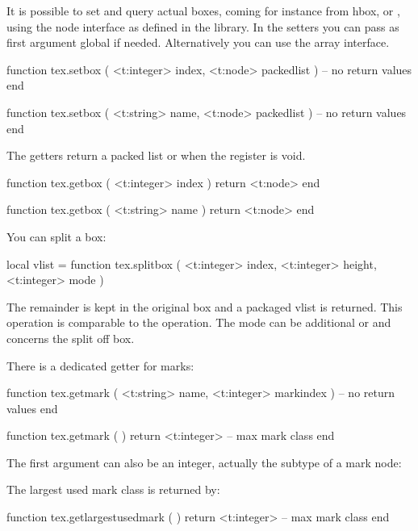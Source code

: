 \stopsubsection

\startsubsection[title={Box registers}]

It is possible to set and query actual boxes, coming for instance from \prm
{hbox},  or , using the node interface as defined in the
 library. In the setters you can pass as first argument \type
{global} if needed. Alternatively you can use the  array
interface.

\starttyping[option=LUA]
function tex.setbox (
    <t:integer> index,
    <t:node>    packedlist
)
    -- no return values
end

function tex.setbox (
    <t:string> name,
    <t:node>   packedlist
)
    -- no return values
end
\stoptyping

The getters return a packed list or  when the register is void.

\starttyping[option=LUA]
function tex.getbox (
    <t:integer> index
)
    return <t:node>
end

function tex.getbox (
    <t:string> name
)
    return <t:node>
end
\stoptyping

You can split a box:

\starttyping[option=LUA]
local vlist =
function tex.splitbox (
    <t:integer> index,
    <t:integer> height,
    <t:integer> mode
)
\stoptyping

The remainder is kept in the original box and a packaged vlist is returned. This
operation is comparable to the \type {\vsplit} operation. The mode can be \type
{additional} or  and concerns the split off box.

\stopsubsection

\startsubsection[title=Marks]

There is a dedicated getter for marks:

\starttyping[option=LUA]
function tex.getmark (
    <t:string>  name,
    <t:integer> markindex
)
    -- no return values
end

function tex.getmark ( )
    return <t:integer> -- max mark class
end
\stoptyping

The first argument can also be an integer, actually the subtype of a mark node:

\startcolumns[n=2]
\stopcolumns

The largest used mark class is returned by:

\starttyping[option=LUA]
function tex.getlargestusedmark ( )
    return <t:integer> -- max mark class
end
\stoptyping

